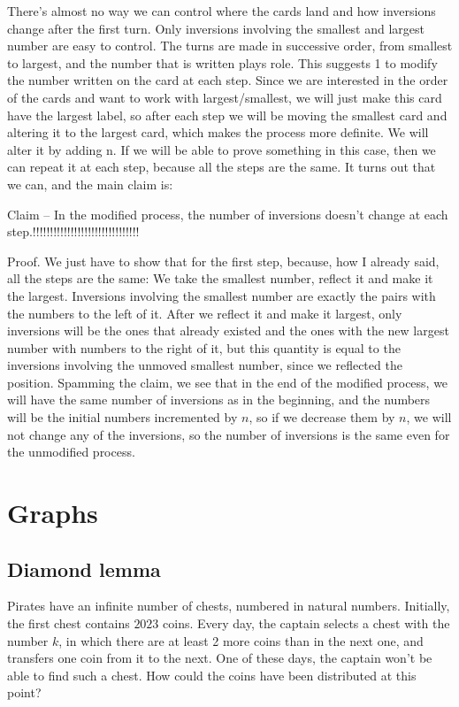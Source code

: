 There’s almost no way we can control where the cards land and how inversions change after the first turn. Only inversions involving the smallest and largest number are easy to control. The turns are made in successive order, from smallest to largest, and the number that is written plays role. This suggests 1 to modify the number written on the card at each step. Since we are interested in the order of the cards and want to work with largest/smallest, we will just make this card have the largest label, so after each step we will be moving the smallest card and altering it to the largest card, which makes the process more definite. We will alter it by adding n. If we will be able to prove something in this case, then we can repeat it at each step, because all the steps are the same. It turns out that we can, and the main claim is:

Claim -- In the modified process, the number of inversions doesn’t change at each step.!!!!!!!!!!!!!!!!!!!!!!!!!!!!!!!

Proof. We just have to show that for the first step, because, how I already said, all the steps are the same: We take the smallest number, reflect it and make it the largest. Inversions involving the smallest number are exactly the pairs with the numbers to the left of it. After we reflect it and make it largest, only inversions will be the ones that already existed and the ones with the new largest number with numbers to the right of it, but this quantity is equal to the inversions involving the unmoved smallest number, since we reflected the position. Spamming the claim, we see that in the end of the modified process, we will have the same number of inversions as in the beginning, and the numbers will be the initial numbers incremented by $n$, so if we decrease them by $n$, we will not change any of the inversions, so the number of inversions is the same even for the unmodified process.

\section{Graphs}

\subsection{Diamond lemma}

\begin{example}
    Pirates have an infinite number of chests, numbered in natural numbers. Initially, the first chest contains $2023$ coins. Every day, the captain selects a chest with the number $k$, in which there are at least 2 more coins than in the next one, and transfers one coin from it to the next. One of these days, the captain won't be able to find such a chest. How could the coins have been distributed at this point?
\end{example}


